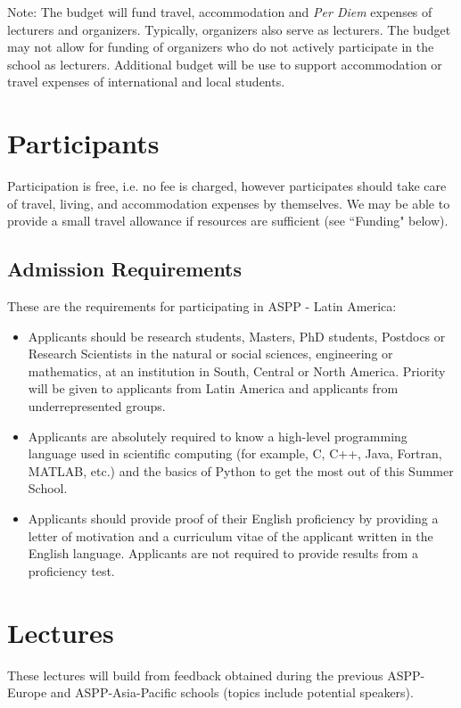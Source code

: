 \documentclass{article}[11pt]
\begin{document}
Note: The budget will fund travel, accommodation and \textit{Per Diem} expenses of lecturers and organizers. 
Typically, organizers also serve as lecturers. 
The budget may not allow for funding of organizers who do not actively participate in the school as lecturers. Additional budget will be use to support accommodation or travel expenses of international and local students.

\section*{Participants}
Participation is free, i.e. no fee is charged, however participates should take care of travel, living, and accommodation expenses by themselves.
We may be able to provide a small travel allowance if resources are sufficient (see ``Funding" below).

\subsection*{Admission Requirements}
These are the requirements for participating in ASPP - Latin America:
\begin{itemize}
    \item Applicants should be research students, Masters, PhD students, Postdocs or Research Scientists in the natural or social sciences, engineering or mathematics, at an institution in South, Central or North America. Priority will be given to applicants from Latin America and applicants from underrepresented groups.
    \item Applicants are absolutely required to know a high-level programming language used in scientific computing (for example, C, C++, Java, Fortran, MATLAB, etc.) and the basics of Python to get the most out of this Summer School.
    \item Applicants should provide proof of their English proficiency by providing a letter of motivation and a curriculum vitae of the applicant written in the English language. Applicants are not required to provide results from a proficiency test.
\end{itemize}

\section*{Lectures}%

These lectures will build from feedback obtained during the previous ASPP-Europe and ASPP-Asia-Pacific schools (topics include potential speakers).
\end{document}
